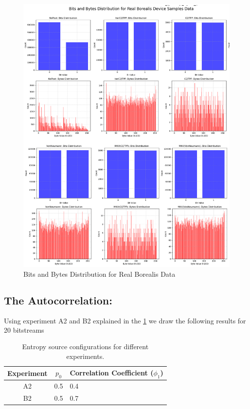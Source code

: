 \begin{figure}[h!]
    \centering
    \includegraphics[width=\textwidth]{figures/BorealisResults Dist.png}
    \caption{Bits and Bytes Distribution for Real Borealis Data}
    \label{fig:grph3}
\end{figure}


\subsection{The Autocorrelation:}

Using experiment A2 and B2 explained in the \ref{tab:experiments2} we draw the following results for 20 bitstreams 

\begin{table}[h!]
    \centering
    \begin{tabular}{|c|c|l|}
        \hline
        \textbf{Experiment} & \textbf{\( p_0 \)} & \textbf{Correlation Coefficient (\( \phi_1 \))}  \\
        \hline
        A2 & 0.5 & 0.4 \\
        B2 & 0.5 & 0.7 \\

        \hline
    \end{tabular}
    \caption{Entropy source configurations for different experiments.}
    \label{tab:experiments2}
\end{table}

